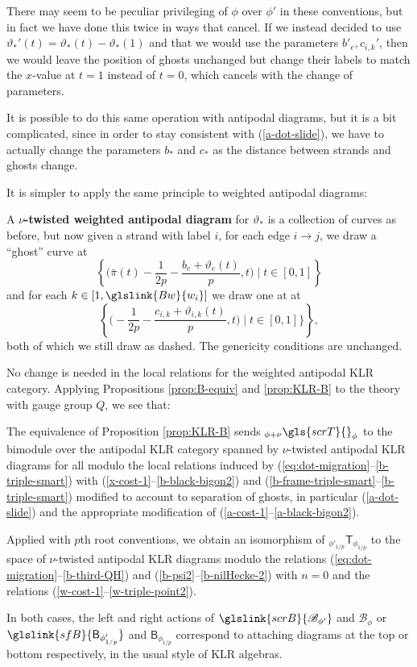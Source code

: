 There may seem to be peculiar privileging of $\phi$ over $\phi'$ in
these conventions, but
in fact we have done this twice in ways that cancel.  If we instead
decided to use $\vartheta_*'(t)=\vartheta_*(t)-\vartheta_*(1)$ and that we would use the
parameters $b'_e,c_{i,k}'$, then we would leave the position of ghosts
unchanged but change their labels to match the $x$-value at $t=1$
instead of $t=0$, which cancels with the change of parameters.

It is possible to do this same operation with antipodal diagrams, but
it is a bit complicated, since in order to stay consistent with
(\ref{a-dot-slide}), we have to actually change the parameters $b_*$ and
$c_{*}$ as the distance between strands and ghosts change.  

It is simpler to apply the same principle to weighted antipodal diagrams:
\begin{definition}
  A {\bf $\nu$-twisted weighted antipodal diagram} for $\vartheta_*$ is a collection of curves as
  before, but now given a strand with label $i$,  for each edge $i\to j$, we draw a ``ghost'' curve at
  \[\left\{\Big(\bar{\pi}(t)-\frac{1}{2p}-\frac{b_e+\vartheta_e(t)}{p},t\Big)\mid t\in [0,1]\right\}\] and
  for each $k\in [1,\glslink{Bw}{w_i}]$ we draw one at at
\[\left\{\Big(-\frac{1}{2p}-\frac{c_{i,k}+\vartheta_{i,k}(t)}{p},t\Big)\mid t\in [0,1]\}\right\},\] both of which
  we still draw as dashed.  The genericity conditions are unchanged.  
\end{definition}
No change is needed in the local relations for the weighted antipodal
KLR category.   
Applying
Propositions \ref{prop:B-equiv} and  \ref{prop:KLR-B} to the theory with gauge group $Q$, we
see that:
\begin{lemma}
   The equivalence of Proposition \ref{prop:KLR-B} sends
   ${}_{\phi+\nu}\gls{scrT}{}_{\phi}$ to the bimodule over the
   antipodal KLR category spanned by $\nu$-twisted antipodal KLR
   diagrams  for all modulo   the local relations induced by
   (\ref{eq:dot-migration}--\ref{b-triple-smart}) with (\ref{x-cost-1}--\ref{b-black-bigon2}) and
(\ref{b-frame-triple-smart}--\ref{b-triple-smart}) modified to account
to separation of ghosts, in particular
   (\ref{a-dot-slide}) and the appropriate modification of
   (\ref{a-cost-1}--\ref{a-black-bigon2}).  

  Applied with $p$th root conventions, we obtain an isomorphism of
  ${}_{\phi'_{1/p}}\mathsf{T}_{\phi_{1/p}}$ to the space of
  $\nu$-twisted antipodal KLR diagrams modulo the relations (\ref{eq:dot-migration}--\ref{b-third-QH}) and
  (\ref{b-psi2}--\ref{b-nilHecke-2}) with $n=0$ and the relations
  (\ref{w-cost-1}--\ref{w-triple-point2}).

  In both cases, the left and right actions of $\glslink{scrB}{\mathscr{B}_{\phi'}}$
  and $\mathscr{B}_{\phi}$ or $\glslink{sfB}{\mathsf{B}_{\phi'_{1/p}}}$
  and $\mathsf{B}_{\phi_{1/p}}$ correspond to attaching diagrams at
  the top or bottom respectively, in the usual style of KLR algebras.
\end{lemma}
